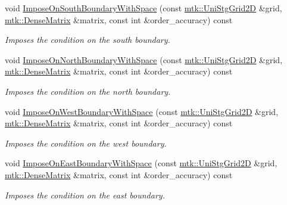 \begin{DoxyCompactItemize}
void \hyperlink{classmtk_1_1BCDescriptor2D_af30c275cf06176a2ae9722014142c810}{Impose\+On\+South\+Boundary\+With\+Space} (const \hyperlink{classmtk_1_1UniStgGrid2D}{mtk\+::\+Uni\+Stg\+Grid2\+D} \&grid, \hyperlink{classmtk_1_1DenseMatrix}{mtk\+::\+Dense\+Matrix} \&matrix, const int \&order\+\_\+accuracy) const 
\begin{DoxyCompactList}\small\item\em Imposes the condition on the south boundary. \end{DoxyCompactList}\item 
void \hyperlink{classmtk_1_1BCDescriptor2D_a6b9b6f2bec06bce5a9070236ca10ec3a}{Impose\+On\+North\+Boundary\+With\+Space} (const \hyperlink{classmtk_1_1UniStgGrid2D}{mtk\+::\+Uni\+Stg\+Grid2\+D} \&grid, \hyperlink{classmtk_1_1DenseMatrix}{mtk\+::\+Dense\+Matrix} \&matrix, const int \&order\+\_\+accuracy) const 
\begin{DoxyCompactList}\small\item\em Imposes the condition on the north boundary. \end{DoxyCompactList}\item 
void \hyperlink{classmtk_1_1BCDescriptor2D_aa5d88027ff9c5d2eccab93cd51154c9e}{Impose\+On\+West\+Boundary\+With\+Space} (const \hyperlink{classmtk_1_1UniStgGrid2D}{mtk\+::\+Uni\+Stg\+Grid2\+D} \&grid, \hyperlink{classmtk_1_1DenseMatrix}{mtk\+::\+Dense\+Matrix} \&matrix, const int \&order\+\_\+accuracy) const 
\begin{DoxyCompactList}\small\item\em Imposes the condition on the west boundary. \end{DoxyCompactList}\item 
void \hyperlink{classmtk_1_1BCDescriptor2D_a7208d08bfa84192e13c848093eaa88f0}{Impose\+On\+East\+Boundary\+With\+Space} (const \hyperlink{classmtk_1_1UniStgGrid2D}{mtk\+::\+Uni\+Stg\+Grid2\+D} \&grid, \hyperlink{classmtk_1_1DenseMatrix}{mtk\+::\+Dense\+Matrix} \&matrix, const int \&order\+\_\+accuracy) const 
\begin{DoxyCompactList}\small\item\em Imposes the condition on the east boundary. \end{DoxyCompactList}\end{DoxyCompactItemize}
